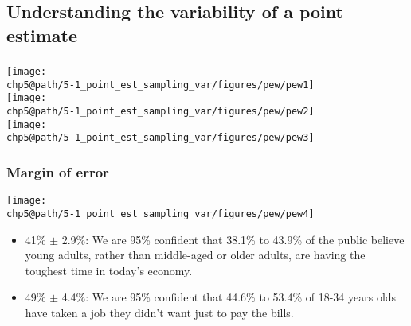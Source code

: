 \documentclass[t,compress,mathserif]{beamer}
\makeatletter
\def\chp5@path{../../Chp 5}
\makeatother
\begin{document}
\subsection{Understanding the variability of a point estimate}


\begin{frame}
    \frametitle{}
    
    \begin{center}
    \texttt{[image: \\chp5@path/5-1\_point\_est\_sampling\_var/figures/pew/pew1]} \\
    \texttt{[image: \\chp5@path/5-1\_point\_est\_sampling\_var/figures/pew/pew2]} \\
    \texttt{[image: \\chp5@path/5-1\_point\_est\_sampling\_var/figures/pew/pew3]}
    \end{center}
    
    
\end{frame}


\begin{frame}
    \frametitle{Margin of error}
    
    \begin{center}
    \texttt{[image: \\chp5@path/5-1\_point\_est\_sampling\_var/figures/pew/pew4]}
    \end{center}
    
    \begin{itemize}
    
    \item 41\% $\pm$ 2.9\%: We are 95\% confident that 38.1\% to 43.9\% of the public believe young adults, rather than middle-aged or older adults, are having the toughest time in today's economy.
    
    \item 49\% $\pm$ 4.4\%: We are 95\% confident that 44.6\% to 53.4\% of 18-34 years olds have taken a job they didn't want just to pay the bills.
    
    \end{itemize}
    
\end{frame}

\end{document}

